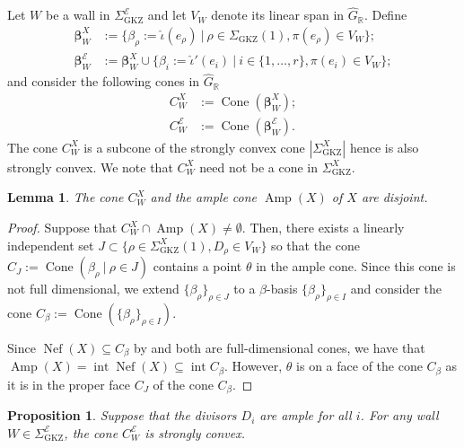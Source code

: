\documentclass[reqno, 12pt]{amsart}
\newtheorem{lemma}[theorem]{Lemma}
\newtheorem{proposition}[theorem]{Proposition}
\theoremstyle{definition}
\newcommand{\op}[1]{\operatorname{#1}}
\newcommand{\Amp}{\operatorname{Amp}}
\numberwithin{equation}{section}
\begin{document}
Let $W$ be a wall in $\Sigma^{\mathcal E}_{\op{GKZ}}$ and let $V_W$ denote its linear span in $\widehat G_{\mathbb R}$. Define
\begin{align*}
\boldsymbol{\beta}^X_W &:= \{\beta_\rho:=\hat\iota(e_\rho) \ | \ \rho \in \Sigma_{\op{GKZ}}(1), \pi(e_\rho) \in V_W \}; \\
\boldsymbol{\beta}^{\mathcal{E}}_W &:= \boldsymbol{\beta}^X_W\cup  \{\beta_i:= \hat\iota'(e_i) \ | \ i \in \{1, \dots, r\}, \pi(e_i) \in V_W\};
\end{align*}
and consider the following cones in $\widehat G_{\mathbb R}$
\begin{align*}
C_W^X & := \op{Cone}(\boldsymbol{\beta}^X_W); \\
C_W^{\mathcal{E}} & := \op{Cone} (\boldsymbol{\beta}^{\mathcal{E}}_W ). 
\end{align*}
\noindent The cone $C^X_W$ is a subcone of the strongly convex cone $|\Sigma^X_{\op{GKZ}}|$ hence is also strongly convex. We note that $C^X_W$ need not be a cone in $\Sigma^X_{\op{GKZ}}$. 


\begin{lemma} \label{prop: ample cone}
    The cone $C_W^X$ and the ample cone $\Amp(X)$ of $X$ are disjoint.
 \end{lemma}
 
 \begin{proof}
     Suppose that $C^X_W \cap \Amp(X) \ne \emptyset$. %
    Then, there exists a linearly independent set $J \subset \{ \rho \in \Sigma^X_{\op{GKZ}}(1), D_\rho \in V_W\}$ so that the cone $C_J := \op{Cone}(\beta_\rho \ | \ \rho \in J)$ contains a point $\theta$ in the ample cone.  Since this cone is not full dimensional, we extend $\{\beta_\rho\}_{\rho \in J}$ to a $\beta$-basis $\{\beta_\rho\}_{\rho \in I}$ and consider the cone $C_\beta := \op{Cone}(\{\beta_\rho\}_{\rho \in I})$. 

    Since $ \op{Nef}(X) \subseteq C_\beta$ by \cite[Proposition 15.2.1]{CLS} and both are full-dimensional cones, we have that  $\op{Amp}(X) = \op{int}\op{Nef}(X) \subseteq \op{int} C_\beta$. However, $\theta$ is on a face of the cone $C_\beta$ as it is in the proper face $C_J$ of the cone $C_\beta$.
 \end{proof}

\begin{proposition}\label{prop:strongly convex weight cone}
Suppose that the divisors $D_i$ are ample for all $i$. For any wall $W \in \Sigma^{\mathcal E}_{\op{GKZ}}$, the cone $C^{\mathcal E}_W$ is strongly convex.
\end{proposition}
\end{document}
